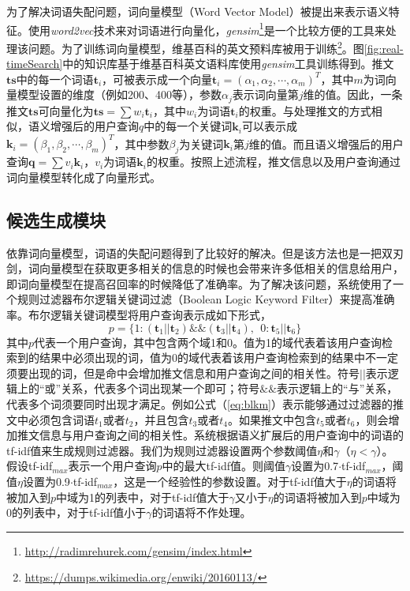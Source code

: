 为了解决词语失配问题，词向量模型（Word Vector Model）被提出来表示语义特征。使用\textit{word2vec}技术来对词语进行向量化，\textit{gensim}\footnote{\url{http://radimrehurek.com/gensim/index.html}}是一个比较方便的工具来处理该问题。为了训练词向量模型，维基百科的英文预料库被用于训练\footnote{\url{https://dumps.wikimedia.org/enwiki/20160113/}}。图\ref{fig:real-timeSearch}中的知识库基于维基百科英文语料库使用\textit{gensim}工具训练得到。推文$\mathbf{ts}$中的每一个词语$\mathbf{t}_i$，可被表示成一个向量$\mathbf{t}_i=\left(\alpha_1,\alpha_2,\cdots,\alpha_m\right)^T$，其中$m$为词向量模型设置的维度（例如200、400等），参数$\alpha_j$表示词向量第$j$维的值。因此，一条推文$\mathbf{ts}$可向量化为$\mathbf{ts}= \sum w_i \mathbf{t}_i$，其中$w_i$为词语$\mathbf{t}_i$的权重。与处理推文的方式相似，语义增强后的用户查询$q$中的每一个关键词$\mathbf{k}_i$可以表示成$\mathbf{k}_i = \left(\beta_1,\beta_2,\cdots,\beta_m\right)^T$，其中参数$\beta_j$为关键词$\mathbf{k}_i$第$j$维的值。而且语义增强后的用户查询$\mathbf{q} = \sum v_i \mathbf{k}_i$，$v_i$为词语$\mathbf{k}_i$的权重。按照上述流程，推文信息以及用户查询通过词向量模型转化成了向量形式。

\subsection{候选生成模块}
\label{subsec2:candidate}
依靠词向量模型，词语的失配问题得到了比较好的解决。但是该方法也是一把双刃剑，词向量模型在获取更多相关的信息的时候也会带来许多低相关的信息给用户，即词向量模型在提高召回率的时候降低了准确率。为了解决该问题，系统使用了一个规则过滤器布尔逻辑关键词过滤（Boolean Logic Keyword Filter）来提高准确率。布尔逻辑关键词模型将用户查询表示成如下形式，
\begin{equation}
\label{eq:blkm}
  p = \{1:\left(\mathbf{t}_1 || \mathbf{t}_2\right) \& \& \left(\mathbf{t}_3 || \mathbf{t}_4\right),~~0:\mathbf{t}_5 || \mathbf{t}_6\}
\end{equation}
其中$p$代表一个用户查询，其中包含两个域1和0。值为1的域代表着该用户查询检索到的结果中必须出现的词，值为0的域代表着该用户查询检索到的结果中不一定须要出现的词，但是命中会增加推文信息和用户查询之间的相关性。符号$||$表示逻辑上的“或”关系，代表多个词出现某一个即可；符号$\&\&$表示逻辑上的“与”关系，代表多个词须要同时出现才满足。例如公式（\ref{eq:blkm}）表示能够通过过滤器的推文中必须包含词语$t_1$或者$t_2$，并且包含$t_3$或者$t_4$。如果推文中包含$t_5$或者$t_6$，则会增加推文信息与用户查询之间的相关性。系统根据语义扩展后的用户查询中的词语的tf-idf值来生成规则过滤器。我们为规则过滤器设置两个参数阈值$\eta$和$\gamma$（$\eta < \gamma$）。假设tf-idf$_{max}$表示一个用户查询$p$中的最大tf-idf值。则阈值$\gamma$设置为0.7$\cdot$tf-idf$_{max}$，阈值$\eta$设置为0.9$\cdot$tf-idf$_{max}$，这是一个经验性的参数设置。对于tf-idf值大于$\eta$的词语将被加入到$p$中域为1的列表中，对于tf-idf值大于$\gamma$又小于$\eta$的词语将被加入到$p$中域为0的列表中，对于tf-idf值小于$\gamma$的词语将不作处理。

